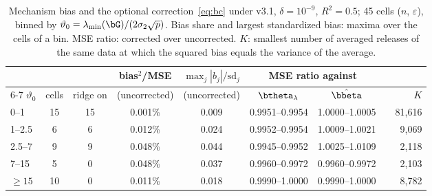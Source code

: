 \begin{table}[t]
  \centering
  \small
  \caption{Mechanism bias and the optional correction~\eqref{eq:bc} under v3.1, $\delta = 10^{-9}$, $R^2 = 0.5$; 45 cells ($n$, $\varepsilon$), binned by $\vartheta_0 = \lambda_{\min}(\bG)/(2\sigma_2\sqrt p)$. Bias share and largest standardized bias: maxima over the cells of a bin. MSE ratio: corrected over uncorrected. $K$: smallest number of averaged releases of the same data at which the squared bias equals the variance of the average.}
  \label{tab:bias_v31}
  \setlength{\tabcolsep}{4pt}
  \begin{tabular}{@{}lcccccccr@{}}
    \toprule
    & & & bias$^2$/MSE & $\max_j |b_j|/\mathrm{sd}_j$ & \multicolumn{2}{c}{MSE ratio against} & & \\
    \cmidrule(lr){6-7}
    $\vartheta_0$ & cells & ridge on & (uncorrected) & (uncorrected) & $\btheta_\lambda$ & $\hat\bbeta$ & & $K$ \\
    \midrule
    0--1 & 15 & 15 & 0.001\% & 0.009 & 0.9951--0.9954 & 1.0000--1.0005 & & 81{,}616 \\
    1--2.5 & 6 & 6 & 0.012\% & 0.024 & 0.9952--0.9954 & 1.0009--1.0021 & & 9{,}069 \\
    2.5--7 & 9 & 9 & 0.048\% & 0.044 & 0.9945--0.9952 & 1.0025--1.0109 & & 2{,}118 \\
    7--15 & 5 & 0 & 0.048\% & 0.037 & 0.9960--0.9972 & 0.9960--0.9972 & & 2{,}103 \\
    $\ge 15$ & 10 & 0 & 0.011\% & 0.018 & 0.9990--1.0000 & 0.9990--1.0000 & & 8{,}782 \\
    \bottomrule
  \end{tabular}
\end{table}

